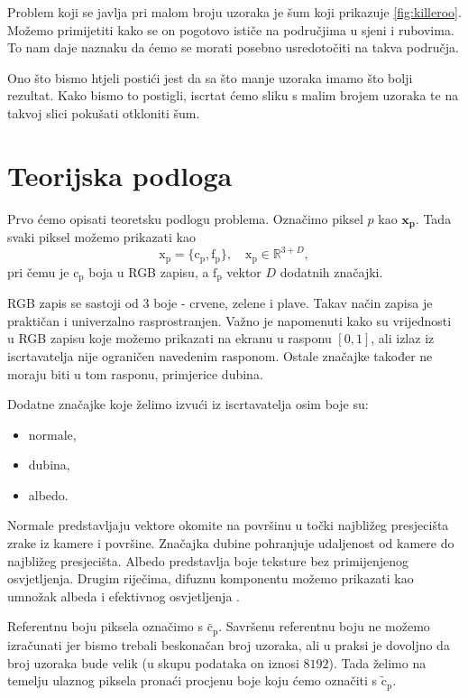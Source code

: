\documentclass[times, utf8, seminar, numeric]{fer}
\newcommand{\vect}[1]{\bm{\mathrm{#1}}}
\begin{document}

Problem koji se javlja pri malom broju uzoraka je šum koji prikazuje \ref{fig:killeroo}. Možemo
primijetiti kako se on pogotovo ističe na područjima u sjeni i rubovima. To nam daje naznaku
da ćemo se morati posebno usredotočiti na takva područja.

Ono što bismo htjeli postići jest da sa što manje uzoraka imamo što bolji rezultat.
Kako bismo to postigli, iscrtat ćemo sliku s malim brojem uzoraka te na takvoj slici pokušati
otkloniti šum.



\chapter{Teorijska podloga}
Prvo ćemo opisati teoretsku podlogu problema. Označimo piksel $p$ kao $\mathbf{x_p}$. Tada
svaki piksel možemo prikazati kao
$$\vect{x_p} = \{\vect{c_p}, \vect{f_p}\}, \quad \vect{x_p} \in \mathbb{R}^{3+D},$$
pri čemu je $\vect{c_p}$ boja u RGB zapisu, a $\vect{f_p}$ vektor $D$ dodatnih značajki.

RGB zapis se sastoji od 3 boje - crvene, zelene i plave. Takav način zapisa je praktičan i univerzalno
rasprostranjen. Važno je napomenuti kako su vrijednosti u RGB zapisu koje možemo prikazati na ekranu u rasponu $[0, 1]$, ali izlaz
iz iscrtavatelja nije ograničen navedenim rasponom. Ostale značajke također ne moraju biti u tom rasponu, primjerice dubina.

Dodatne značajke koje želimo izvući iz iscrtavatelja osim boje su:
\begin{itemize}
\item normale,
\item dubina,
\item albedo.
\end{itemize}

Normale predstavljaju vektore okomite na površinu u točki najbližeg presjecišta zrake iz kamere i površine.
Značajka dubine pohranjuje udaljenost od kamere do najbližeg presjecišta. Albedo predstavlja boje teksture
bez primijenjenog osvjetljenja. Drugim riječima, difuznu komponentu možemo
prikazati kao umnožak albeda i efektivnog osvjetljenja 
\cite{vogels2016thesis}.

Referentnu boju piksela označimo s $\vect{\bar{c}_p}$. Savršenu referentnu boju ne možemo
izračunati jer bismo trebali beskonačan broj uzoraka, ali u praksi je dovoljno da broj uzoraka
bude velik (u skupu podataka on iznosi $8192$). Tada želimo na temelju ulaznog piksela pronaći
procjenu boje koju ćemo označiti s $\vect{\tilde{c}_p}$.
\end{document}
